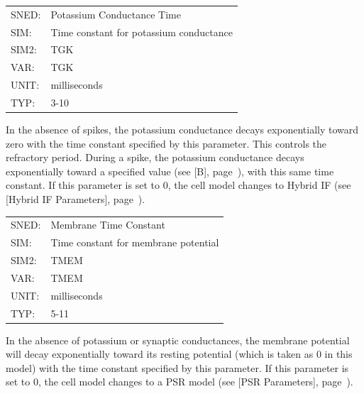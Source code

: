 \documentclass[12pt,openany,oneside]{book}
\newcommand{\tipxref}[1]{see [#1], page~\pageref{#1}}
\begin{document}
\label{TGK}
\begin{flushleft}
\begin{tabular}{@{}ll@{}}
SNED:  &  Potassium Conductance Time\\
SIM:  &  Time constant for potassium conductance\\
SIM2:  &  TGK\\
VAR:  &  TGK\\
UNIT:  &  milliseconds\\
TYP:  &  3-10\\
\end{tabular}
\end{flushleft}

\noindent
In the absence of spikes, the potassium conductance decays
exponentially toward zero with the time constant specified by this
parameter.  This controls the refractory period.  During a spike, the
potassium conductance decays exponentially toward a specified value
(\tipxref{B}), with this same time constant.  If this parameter is set
to 0, the cell model changes to Hybrid IF (\tipxref{Hybrid IF Parameters}).
\filbreak
\vspace{\baselineskip}

\label{TMEM}
\begin{flushleft}
\begin{tabular}{@{}ll@{}}
SNED: & Membrane Time Constant\\
SIM: & Time constant for membrane potential\\
SIM2: & TMEM\\
VAR: & TMEM\\
UNIT: & milliseconds\\
TYP: & 5-11\\
\end{tabular}
\end{flushleft}
\noindent
In the absence of potassium or synaptic conductances, the membrane
potential will decay exponentially toward its resting potential (which
is taken as 0 in this model) with the time constant specified by this
parameter.  If this parameter is set to 0, the cell model changes to a
PSR model (\tipxref{PSR Parameters}).
\filbreak
\vspace{\baselineskip}
\end{document}
